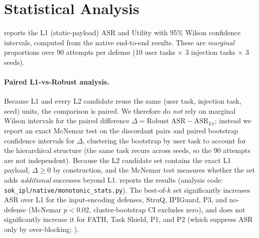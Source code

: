 \appendix
\section{Statistical Analysis}
\label{app:stats}

 reports the L1 (static-payload) ASR and Utility with 95\% Wilson confidence intervals, computed from the native end-to-end results. These are \emph{marginal} proportions over 90 attempts per defense (10 user tasks $\times$ 3 injection tasks $\times$ 3 seeds).

\paragraph{Paired L1-vs-Robust analysis.} Because L1 and every L2 candidate reuse the same (user task, injection task, seed) units, the comparison is paired. We therefore do \emph{not} rely on marginal Wilson intervals for the paired difference $\Delta=\text{Robust ASR}-\mathrm{ASR}_{L1}$; instead we report an exact McNemar test on the discordant pairs and paired bootstrap confidence intervals for $\Delta$, clustering the bootstrap by user task to account for the hierarchical structure (the same task recurs across seeds, so the 90 attempts are not independent). Because the L2 candidate set contains the exact L1 payload, $\Delta\geq 0$ by construction, and the McNemar test measures whether the set adds \emph{additional} successes beyond L1.  reports the results (analysis code: \texttt{sok\_ipl/native/monotonic\_stats.py}). The best-of-$k$ set significantly increases ASR over L1 for the input-encoding defenses, StruQ, IPIGuard, P3, and no-defense (McNemar $p<0.02$, cluster-bootstrap CI excludes zero), and does not significantly increase it for FATH, Task Shield, P1, and P2 (which suppress ASR only by over-blocking; ).

